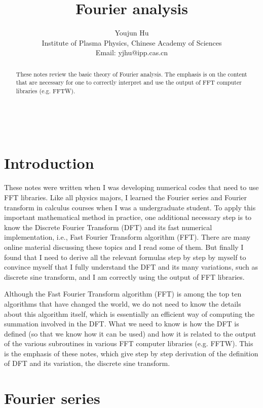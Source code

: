 \documentclass{article}
\newcommand{\tmaffiliation}[1]{\\ #1}
\begin{document}
\

\title{Fourier analysis}

\author{
  Youjun Hu
  \tmaffiliation{Institute of Plasma Physics, Chinese Academy of Sciences\\
  Email: yjhu@ipp.cas.cn}
}

\maketitle

\begin{abstract}
  These notes review the basic theory of Fourier analysis. The emphasis is on
  the content that are necessary for one to correctly interpret and use the
  output of FFT computer libraries (e.g. FFTW).
\end{abstract}

\section{Introduction}

These notes were written when I was developing numerical codes that need to
use FFT libraries. Like all physics majors, I learned the Fourier series and
Fourier transform in calculus courses when I was a undergraduate student. To
apply this important mathematical method in practice, one additional necessary
step is to know the Discrete Fourier Transform (DFT) and its fast numerical
implementation, i.e., Fast Fourier Transform algorithm (FFT). There are many
online material discussing these topics and I read some of them. But finally I
found that I need to derive all the relevant formulas step by step by myself
to convince myself that I fully understand the DFT and its many variations,
such as discrete sine transform, and I am correctly using the output of FFT
libraries.

Although the Fast Fourier Transform algorithm (FFT) is among the top ten
algorithms that have changed the world, we do not need to know the details
about this algorithm itself, which is essentially an efficient way of
computing the summation involved in the DFT. What we need to know is how the
DFT is defined (so that we know how it can be used) and how it is related to
the output of the various subroutines in various FFT computer libraries (e.g.
FFTW). This is the emphasis of these notes, which give step by step derivation
of the definition of DFT and its variation, the discrete sine transform.

\section{Fourier series}
\end{document}
